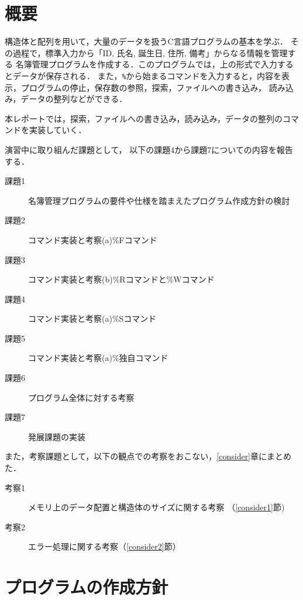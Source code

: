 \section{概要} \label{sec:abstract}
構造体と配列を用いて，大量のデータを扱うC言語プログラムの基本を学ぶ．
その過程で，標準入力から「ID, 氏名, 誕生日, 住所, 備考」からなる情報を管理する
名簿管理プログラムを作成する．このプログラムでは，上の形式で入力するとデータが保存される．
また，\verb|%|から始まるコマンドを入力すると，内容を表示，プログラムの停止，保存数の参照，探索，ファイルへの書き込み，
読み込み，データの整列などができる．

本レポートでは，探索，ファイルへの書き込み，読み込み，データの整列のコマンドを実装していく．


演習中に取り組んだ課題として，
以下の課題4から課題7についての内容を報告する．

\begin{description}
  \item[課題1]名簿管理プログラムの要件や仕様を踏まえたプログラム作成方針の検討
  \item[課題2]コマンド実装と考察(a)\%Fコマンド
  \item[課題3]コマンド実装と考察(b)\%Rコマンドと\%Wコマンド
  \item[課題4]コマンド実装と考察(a)\%Sコマンド
  \item[課題5]コマンド実装と考察(a)\%独自コマンド
  \item[課題6]プログラム全体に対する考察
  \item[課題7]発展課題の実装

\end{description}

また，考察課題として，以下の観点での考察をおこない，\ref{consider}章にまとめた．

\begin{description}
  \item[考察1]メモリ上のデータ配置と構造体のサイズに関する考察 （\ref{consider1}節)
  \item[考察2] エラー処理に関する考察（\ref{consider2}節）
\end{description}
\clearpage

\section{プログラムの作成方針} \label{sec:plan-of-programming}
    

